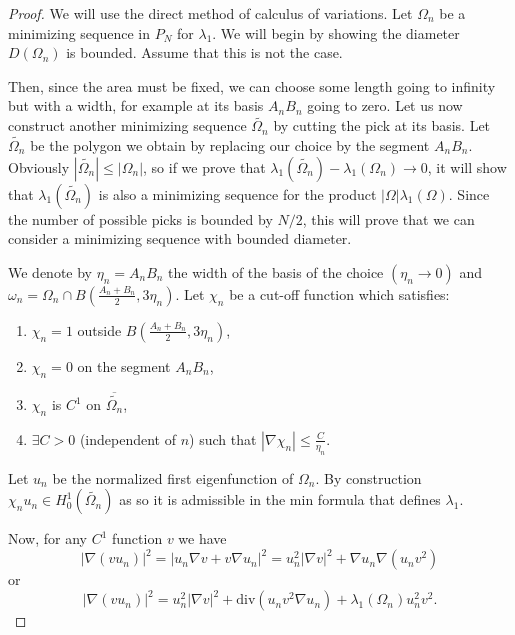 \documentclass[12pt]{report}
\numberwithin{definition}{section}
\begin{document}
\begin{proof}

  We will use the direct method of calculus of variations.
  Let $\Omega_{n}$ be a minimizing sequence in $P_{N}$ for $\lambda_1$.
  We will begin by showing the diameter $D(\Omega_{n})$ is bounded.
  Assume that this is not the case.

  Then, since the area must be fixed, we can choose some length going to infinity but with a width, for example at its basis $A_{n}B_{n}$ going to zero.
  Let us now construct another minimizing sequence $\widetilde{\Omega_{n}}$ by cutting the pick at its basis.
  Let $\widetilde{\Omega_{n}}$ be the polygon we obtain by replacing our choice by the segment $A_{n}B_{n}$.
  Obviously $| \widetilde{\Omega_{n}} | \leq | \Omega_{n} | $, so if we prove that $\lambda_{1}(\widetilde{\Omega_{n}}) - \lambda_{1}(\Omega_{n}) \to 0$, it will show that $\lambda_{1}(\widetilde{\Omega_{n}})$ is also a minimizing sequence for the product $| \Omega | \lambda_{1}(\Omega)$.
  Since the number of possible picks is bounded by $N / 2$, this will prove that we can consider a minimizing sequence with bounded diameter.

  We denote by $\eta_{n} = A_{n}B_{n}$ the width of the basis of the choice $(\eta_{n} \to 0)$ and $\omega_{n} = \Omega_{n} \cap B(\frac{A_{n} + B_{n}}{2}, 3\eta_{n})$.
  Let $\chi_{n}$ be a cut-off function which satisfies:
  \begin{enumerate}
    \item $\chi_{n} = 1$ outside $B(\frac{A_{n} + B_{n}}{2}, 3\eta_{n})$,
    \item $\chi_{n} = 0$ on the segment $A_{n}B_{n}$,
    \item $\chi_{n}$ is $C^{1}$ on $\overline{\widetilde{\Omega_{n}}}$,
    \item $\exists C > 0$ (independent of $n$) such that $| \nabla \chi_{n} | \leq \frac{C}{\eta_{n}}$.
  \end{enumerate}

  Let $u_{n}$ be the normalized first eigenfunction of $\Omega_{n}$.
  By construction $\chi_{n}u_{n} \in H_{0}^{1}(\widetilde{\Omega_{n}})$ as so it is admissible in the min formula that defines $\lambda_{1}$.

  Now, for any $C^{1}$ function $v$ we have
  \[
  | \nabla(v u_{n}) |^{2} = | u_{n} \nabla v + v \nabla u_{n}  |^{2} = u_{n}^{2} | \nabla v |^{2} + \nabla u_{n} \nabla (u_{n}v^{2})
  \] 
  or 
  \[
    | \nabla(v u_{n}) |^{2} = u_{n}^{2} | \nabla v |^2 + \text{div} (u_{n} v^2 \nabla u_{n}) + \lambda_{1}(\Omega_{n})u_{n}^2 v^2
  .\] 


\end{proof}
\end{document}
